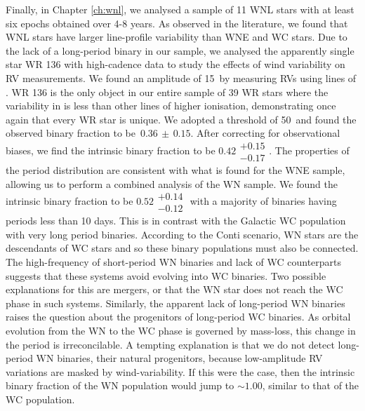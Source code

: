 Finally, in Chapter \ref{ch:wnl}, we analysed a sample of 11 WNL stars with at least six epochs obtained over 4-8 years. As observed in the literature, we found that WNL stars have larger line-profile variability than WNE and WC stars. Due to the lack of a long-period binary in our sample, we analysed the apparently single star WR 136 with high-cadence data to study the effects of wind variability on RV measurements. We found an amplitude of 15\,\kms{} by measuring RVs using lines of \heii{}. WR 136 is the only object in our entire sample of 39 WR stars where the variability in \heii{} is less than other lines of higher ionisation, demonstrating once again that every WR star is unique. We adopted a threshold of 50\,\kms{} and found the observed binary fraction to be $\,0.36\,\pm\,0.15$. After correcting for observational biases, we find the intrinsic binary fraction to be $0.42\substack{+0.15 \\ -0.17}$. The properties of the period distribution are consistent with what is found for the WNE sample, allowing us to perform a combined analysis of the WN sample. We found the intrinsic binary fraction to be $0.52\substack{+0.14 \\ -0.12}$ with a majority of binaries having periods less than 10 days. This is in contrast with the Galactic WC population with very long period binaries. According to the Conti scenario, WN stars are the descendants of WC stars and so these binary populations must also be connected. The high-frequency of short-period WN binaries and lack of WC counterparts suggests that these systems avoid evolving into WC binaries. Two possible explanations for this are mergers, or that the WN star does not reach the WC phase in such systems. Similarly, the apparent lack of long-period WN binaries raises the question about the progenitors of long-period WC binaries. As orbital evolution from the WN to the WC phase is governed by mass-loss, this change in the period is irreconcilable. A tempting explanation is that we do not detect long-period WN binaries, their natural progenitors, because low-amplitude RV variations are masked by wind-variability. If this were the case, then the intrinsic binary fraction of the WN population would jump to ${\sim}1.00$, similar to that of the WC population.





